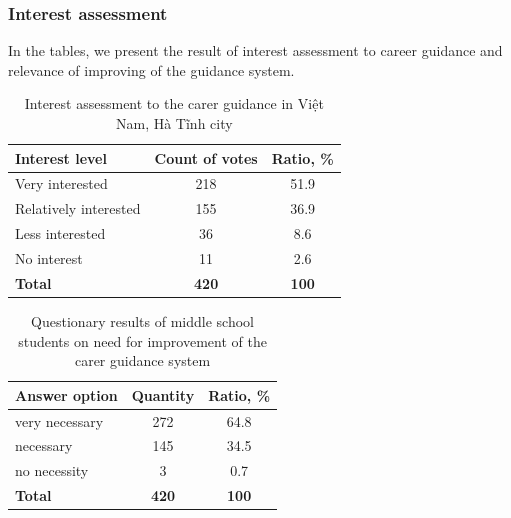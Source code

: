 \documentclass[10pt,dvipsnames]{beamer}
\begin{document}
\begin{frame}
  \frametitle{Interest assessment}
  In the tables, we present the result of interest assessment to career guidance and relevance of improving of the guidance system.
\begin{table}[thb]
  \caption{Interest assessment to the carer guidance in Việt Nam, Hà Tĩnh city}
  \label{tab:interest}
  \centering
  \begin{tabular}{|l|c|c|}
    \hline
    \textbf{Interest level} & \textbf{Count of votes} & \textbf{Ratio, \%} \\
    \hline
    Very interested & 218 & 51.9 \\
    \hline
    Relatively interested & 155 & 36.9 \\
    \hline
    Less interested & 36 & 8.6 \\
    \hline
    No interest & 11 & 2.6 \\
    \textbf{Total} & \textbf{420} & \textbf{100} \\
    \hline
  \end{tabular}
\end{table}

\begin{table}[bht]
  \caption{Questionary results of middle school students on need for improvement of the carer guidance system}
  \label{tab:interest}
  \centering
  \begin{tabular}{|l|c|c|}
    \hline
    \textbf{Answer option} & \textbf{Quantity} & \textbf{Ratio, \%} \\
    \hline
    very necessary & 272 & 64.8 \\
    \hline
    necessary & 145 & 34.5 \\
    \hline
    no necessity & 3 & 0.7 \\
    \hline
    \textbf{Total} & \textbf{420} & \textbf{100} \\
    \hline
  \end{tabular}
\end{table}
\end{frame}
\end{document}
